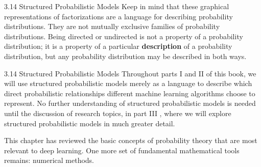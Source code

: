 \begin{frame}{3.14 Structured Probabilistic Models}
    \justifying
    Keep in mind that these graphical representations of factorizations are a language for describing probability distributions. They are not mutually exclusive families of probability distributions. Being directed or undirected is not a property of a probability distribution; it is a property of a particular \textbf{description} of a probability distribution, but any probability distribution may be described in both ways.
\end{frame}

\begin{frame}{3.14 Structured Probabilistic Models}
    \justifying
    Throughout parts I and II of this book, we will use structured probabilistic models merely as a language to describe which direct probabilistic relationships different machine learning algorithms choose to represent. No further understanding of structured probabilistic models is needed until the discussion of research topics, in part III , where we will explore structured probabilistic models in much greater detail.
    
    This chapter has reviewed the basic concepts of probability theory that are most relevant to deep learning. One more set of fundamental mathematical tools remains: numerical methods.
\end{frame}

